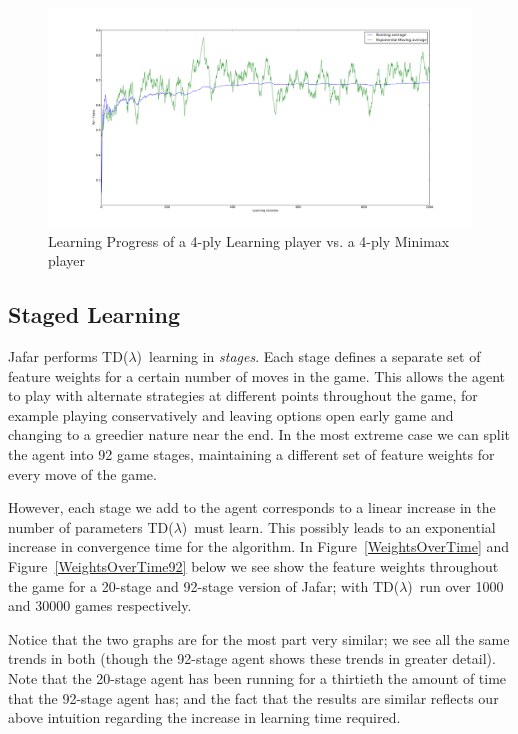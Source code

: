 \documentclass[11pt]{article}
\newcommand{\tdl}{TD($\lambda$)}
\begin{document}
\begin{figure}[htbp]
  \centering
  \includegraphics[trim= 6cm 2cm 5.5cm 3cm, clip,width=1\textwidth]{../Graphs/Learning_2ply_First1000.pdf}
  \caption{Learning Progress of a 4-ply Learning player vs. a 4-ply Minimax
    player}
  \label{LearningProgress}
\end{figure}

\subsection{Staged Learning}
\label{sec:staging}

Jafar performs \tdl\ learning in \emph{stages}. Each stage defines a separate
set of feature weights for a certain number of moves in the game. This allows
the agent to play with alternate strategies at different points throughout the
game, for example playing conservatively and leaving options open early game
and changing to a greedier nature near the end. In the most extreme case we
can split the agent into 92 game stages, maintaining a different set of
feature weights for every move of the game.

However, each stage we add to the agent corresponds to a linear increase in
the number of parameters \tdl\ must learn. This possibly leads to an
exponential increase in convergence time for the algorithm.  In
Figure~\ref{WeightsOverTime} and Figure~\ref{WeightsOverTime92} below we see
show the feature weights throughout the game for a 20-stage and 92-stage
version of Jafar; with \tdl\ run over 1000 and 30000 games respectively.

Notice that the two graphs are for the most part very similar; we see all the
same trends in both (though the 92-stage agent shows these trends in greater
detail). Note that the 20-stage agent has been running for a thirtieth the
amount of time that the 92-stage agent has; and the fact that the results are
similar reflects our above intuition regarding the increase in learning time
required.
\end{document}
